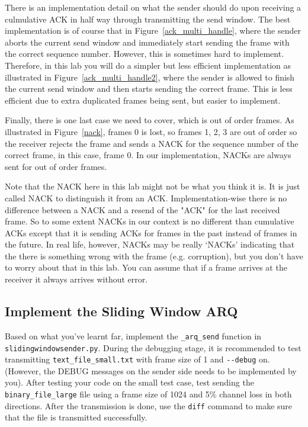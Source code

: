 \documentclass[11pt]{article}
\begin{document}
There is an implementation detail on what the sender should do upon receiving a culmulative ACK in half way through transmitting the send window.
The best implementation is of course that in Figure~\ref{ack_multi_handle}, where the sender aborts the current send window and immediately start sending the frame with the correct sequence number.
However, this is sometimes hard to implement. Therefore, in this lab you will do a simpler but less efficient implementation as illustrated in Figure~\ref{ack_multi_handle2}, where the sender is allowed to finish the current send window and then starts sending the correct frame.
This is less efficient due to extra duplicated frames being sent, but easier to implement.

Finally, there is one last case we need to cover, which is out of order frames.
As illustrated in Figure~\ref{nack}, frames 0 is lost, so frames 1, 2, 3 are out of order so the receiver rejects the frame and sends a NACK for the sequence number of the correct frame, in this case, frame 0.
In our implementation, NACKs are always sent for out of order frames.

Note that the NACK here in this lab might not be what you think it is. It is just called NACK to distinguish it from an ACK.
Implementation-wise there is no difference between a NACK and a resend of the "ACK" for the last received frame.
So to some extent NACKs in our context is no different than cumulative ACKs except that it is sending ACKs for frames in the past instead of frames in the future.
In real life, however, NACKs may be really `NACKs' indicating that the there is something wrong with the frame (e.g. corruption), but you don't have to worry about that in this lab. You can assume that if a frame arrives at the receiver it always arrives without error.


\subsection{Implement the Sliding Window ARQ}
Based on what you've learnt far, implement the \texttt{\_arq\_send} function in \texttt{slidingwindowsender.py}.
During the debugging stage, it is recommended to test transmitting \texttt{text\_file\_small.txt} with frame size of 1 and \texttt{-{}-debug} on.
(However, the DEBUG messages on the sender side needs to be implemented by you).
After testing your code on the small test case, test sending the \texttt{binary\_file\_large} file using a frame size of 1024 and 5\% channel loss in both directions.
After the transmission is done, use the \texttt{diff} command to make sure that the file is transmitted successfully.
\end{document}
